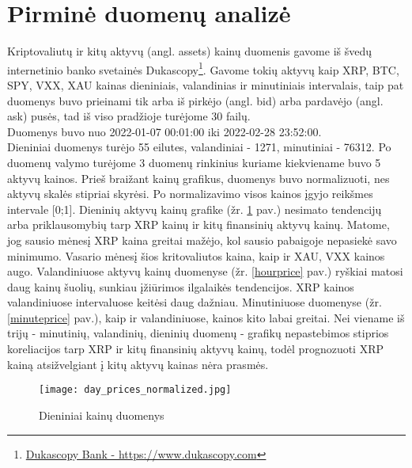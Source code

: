 \documentclass[12pt,a4paper]{article}
\begin{document}
\newpage

\section{Pirminė duomenų analizė}

Kriptovaliutų ir kitų aktyvų (angl. assets) kainų duomenis gavome iš švedų internetinio banko svetainės Dukascopy\footnote{\label{dukascopy} \href{https://www.dukascopy.com/swiss/english/home/}{Dukascopy Bank - https://www.dukascopy.com}}. 
Gavome tokių aktyvų kaip XRP, BTC, SPY, VXX, XAU kainas dieniniais, valandinias ir minutiniais intervalais, taip pat duomenys buvo prieinami tik arba iš pirkėjo (angl. bid) arba pardavėjo (angl. ask) pusės, tad iš viso pradžioje turėjome 30 failų. \\
Duomenys buvo nuo 2022-01-07 00:01:00 iki 2022-02-28 23:52:00.\\
Dieniniai duomenys turėjo 55 eilutes, valandiniai - 1271, minutiniai - 76312.
Po duomenų valymo turėjome 3 duomenų rinkinius kuriame kiekviename buvo 5 aktyvų kainos.
\newline{}Prieš braižant kainų grafikus, duomenys buvo normalizuoti, nes aktyvų skalės stipriai skyrėsi. Po normalizavimo visos kainos įgyjo reikšmes intervale [0;1].
\newline{}Dieninių aktyvų kainų grafike (žr. \ref{dailyprice} pav.) nesimato tendencijų arba priklausomybių tarp XRP kainų ir kitų finansinių aktyvų kainų. Matome, jog sausio mėnesį XRP kaina greitai mažėjo, kol sausio pabaigoje nepasiekė savo minimumo. Vasario mėnesį šios kritovaliutos kaina, kaip ir XAU, VXX kainos augo.
\newline{}Valandiniuose aktyvų kainų duomenyse (žr. \ref{hourprice} pav.) ryškiai matosi daug kainų šuolių, sunkiau įžiūrimos ilgalaikės tendencijos. XRP kainos valandiniuose intervaluose keitėsi daug dažniau.
\newline{}Minutiniuose duomenyse (žr. \ref{minuteprice} pav.), kaip ir valandiniuose, kainos kito labai greitai. Nei viename iš trijų - minutinių, valandinių, dieninių duomenų - grafikų nepastebimos stiprios koreliacijos tarp XRP ir kitų finansinių aktyvų kainų, todėl prognozuoti XRP kainą atsižvelgiant į kitų aktyvų kainas nėra prasmės.

\begin{figure}[!h]
\centering
\caption{Dieniniai kainų duomenys}
\label{dailyprice}
\hspace*{-1cm}\texttt{[image: day\_prices\_normalized.jpg]}
\end{figure}
\end{document}
